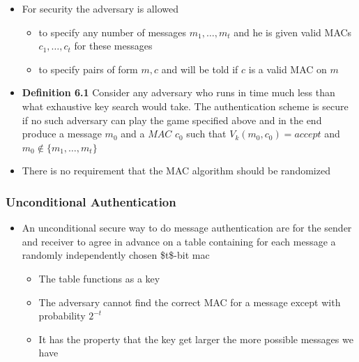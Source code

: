 \documentclass[11pt]{article}
\begin{document}
\begin{itemize}
\item For security the adversary is allowed
\begin{itemize}
\item to specify any number of messages \(m_1,\dots,m_t\) and he is given valid MACs \(c_1, \dots, c_t\) for these messages
\item to specify pairs of form \(m,c\) and will be told if \(c\) is a valid MAC on \(m\)
\end{itemize}

\item \textbf{Definition 6.1} Consider any adversary who runs in time much less than what exhaustive key search would take. The authentication scheme is secure if no such adversary can play the game specified above and in the end produce a message \(m_0\) and a \(MAC\) \(c_0\) such that \(V_k(m_0,c_0) = accept\) and \(m_0 \notin \{m_1, \dots,m_t\}\)

\item There is no requirement that the MAC algorithm should be randomized
\end{itemize}

\subsubsection{Unconditional Authentication}
\label{sec:orgf1f0887}
\begin{itemize}
\item An unconditional secure way to do message authentication are for the sender and receiver to agree in advance on a table containing for each message a randomly independently chosen \$t\$-bit mac
\begin{itemize}
\item The table functions as a key
\item The adversary cannot find the correct MAC for a message except with probability \(2^{-t}\)
\item It has the property that the key get larger the more possible messages we have
\end{itemize}
\end{itemize}
\end{document}
